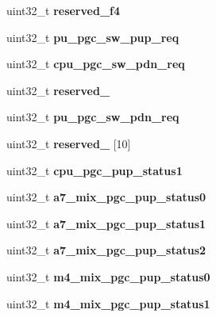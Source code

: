 \begin{DoxyCompactItemize}
uint32\+\_\+t {\bfseries reserved\+\_\+f4}
\item 
\mbox{\label{structimx__gpc_a99f46a9c6d179b43c532f26f489517ad}} 
uint32\+\_\+t {\bfseries pu\+\_\+pgc\+\_\+sw\+\_\+pup\+\_\+req}
\item 
\mbox{\label{structimx__gpc_a5aa9033cf3ae5719b187e8d391c46221}} 
uint32\+\_\+t {\bfseries cpu\+\_\+pgc\+\_\+sw\+\_\+pdn\+\_\+req}
\item 
\mbox{\label{structimx__gpc_a43f9c8a879f8a32970ca305d0709f6ca}} 
uint32\+\_\+t {\bfseries reserved\+\_}
\item 
\mbox{\label{structimx__gpc_aeda0c33e4c421802703cad4504c5dade}} 
uint32\+\_\+t {\bfseries pu\+\_\+pgc\+\_\+sw\+\_\+pdn\+\_\+req}
\item 
\mbox{\label{structimx__gpc_a9b490432476dcd7600947a0189b13e00}} 
uint32\+\_\+t {\bfseries reserved\+\_} \mbox{[}10\mbox{]}
\item 
\mbox{\label{structimx__gpc_a98259c8557142d0e61cb5d585308cbb9}} 
uint32\+\_\+t {\bfseries cpu\+\_\+pgc\+\_\+pup\+\_\+status1}
\item 
\mbox{\label{structimx__gpc_ad881bde871e6c9e0f4f876f42fc5a7b4}} 
uint32\+\_\+t {\bfseries a7\+\_\+mix\+\_\+pgc\+\_\+pup\+\_\+status0}
\item 
\mbox{\label{structimx__gpc_ae4059d8be77a050e5fc6abac7648b959}} 
uint32\+\_\+t {\bfseries a7\+\_\+mix\+\_\+pgc\+\_\+pup\+\_\+status1}
\item 
\mbox{\label{structimx__gpc_a36b4508e46c8dcc042710874641c6a7b}} 
uint32\+\_\+t {\bfseries a7\+\_\+mix\+\_\+pgc\+\_\+pup\+\_\+status2}
\item 
\mbox{\label{structimx__gpc_a685bef3b6602d53edb92f8d8faf24d0d}} 
uint32\+\_\+t {\bfseries m4\+\_\+mix\+\_\+pgc\+\_\+pup\+\_\+status0}
\item 
\mbox{\label{structimx__gpc_a1fb3d802d30b1891b8e6538d075860d8}} 
uint32\+\_\+t {\bfseries m4\+\_\+mix\+\_\+pgc\+\_\+pup\+\_\+status1}

\end{DoxyCompactItemize}
